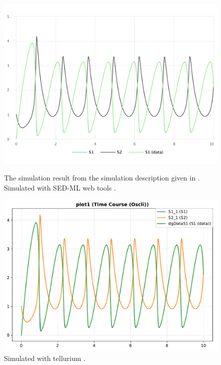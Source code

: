 \begin{figure}[ht]
    \centering
    \begin{minipage}{0.47\textwidth}
        \centering
        \includegraphics[width=1.0\textwidth]{examples/plotting-data-numl/results/sedml_webtools/plot1}
        \caption{The simulation result from the simulation description given in . Simulated with SED-ML web tools \citep{bergmann2017sed}.}
    \end{minipage}\hfill
    \begin{minipage}{0.47\textwidth}
        \centering
        \includegraphics[width=1.0\textwidth]{examples/plotting-data-numl/results/tellurium/plot1}
        \caption{Simulated with tellurium \citep{tellurium}.}
    \end{minipage}
    \label{fig:plotting-data}
\end{figure}

